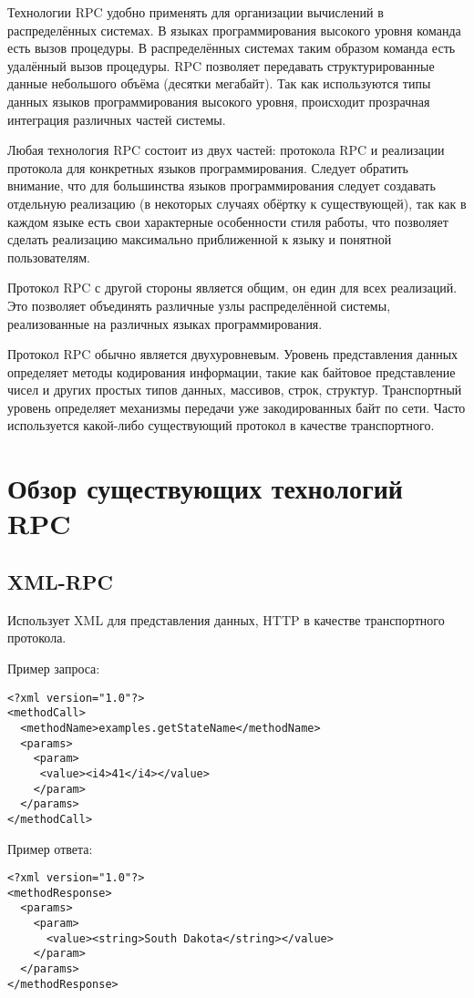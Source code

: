 Технологии RPC удобно применять для организации вычислений в распределённых
системах. В языках программирования высокого уровня команда есть вызов процедуры.
В распределённых системах таким образом команда есть удалённый вызов процедуры.
RPC позволяет передавать структурированные данные небольшого объёма (десятки
мегабайт). Так как используются типы данных языков программирования высокого
уровня, происходит прозрачная интеграция различных частей системы.

Любая технология RPC состоит из двух частей: протокола RPC и
реализации протокола для конкретных языков программирования. Следует обратить
внимание, что для большинства языков программирования следует создавать
отдельную реализацию (в некоторых случаях обёртку к существующей),
так как в каждом языке есть свои характерные особенности стиля работы,
что позволяет сделать реализацию максимально приближенной к языку и понятной
пользователям.

Протокол RPC с другой стороны является общим, он един для всех реализаций.
Это позволяет объединять различные узлы распределённой системы, реализованные
на различных языках программирования.

Протокол RPC обычно является двухуровневым.
Уровень представления данных определяет методы кодирования информации,
такие как байтовое представление чисел и других простых типов данных,
массивов, строк, структур.
Транспортный уровень определяет механизмы передачи уже закодированных байт
по сети. Часто используется какой-либо существующий протокол в качестве
транспортного.

\section{Обзор существующих технологий RPC}
\subsection{XML-RPC}
Использует XML для представления данных, HTTP в качестве транспортного протокола.

\noindent Пример запроса:
\begin{verbatim}
<?xml version="1.0"?>
<methodCall>
  <methodName>examples.getStateName</methodName>
  <params>
    <param>
     <value><i4>41</i4></value>
    </param>
  </params>
</methodCall>
\end{verbatim}

\noindent Пример ответа:
\begin{verbatim}
<?xml version="1.0"?>
<methodResponse>
  <params>
    <param>
      <value><string>South Dakota</string></value>
    </param>
  </params>
</methodResponse>
\end{verbatim}

